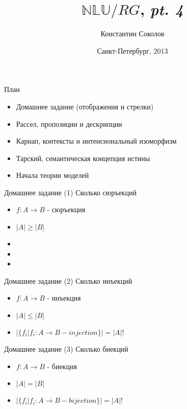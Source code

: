 \documentclass{beamer}
\begin{document}
\title{\huge{$\mathbb{NLU}/RG$, \textit{pt. 4}}}
\author{Константин Соколов}
\date{Санкт-Петербург, 2013} 
\begin{frame}
    \thispagestyle{empty}
    \titlepage
\end{frame}

\begin{frame}{План}
    \setcounter{framenumber}{1}
    \begin{itemize}
        \item Домашнее задание (отображения и стрелки)
        \item Рассел, пропозиции и дескрипции
        \item Карнап, контексты и интенсиональный изоморфизм
        \item Тарский, семантическая концепция истины
        \item Начала теории моделей
    \end{itemize}
\end{frame}

\begin{frame}{Домашнее задание (1)}
Сколько сюръекций\\
  \begin{itemize}
    \item $f : A \to B$ - сюръекция
    \item $\left\vert{A}\right\vert \geq \left\vert{B}\right\vert$
    \item 
    \item 
    \item 
  \end{itemize}  
\end{frame}

\begin{frame}{Домашнее задание (2)}
Сколько инъекций\\
  \begin{itemize}
    \item $f : A \to B$ - инъекция
    \item $\left\vert{A}\right\vert \leq \left\vert{B}\right\vert$
    \item $\left\vert{\{f_i | f_i : A \to B - injection\}}\right\vert = \left\vert{A}\right\vert!$
  \end{itemize}  
\end{frame}

\begin{frame}{Домашнее задание (3)}
Сколько биекций\\
  \begin{itemize}
    \item $f : A \to B$ - биекция
    \item $\left\vert{A}\right\vert = \left\vert{B}\right\vert$
    \item $\left\vert{\{f_i | f_i : A \to B - bijection\}}\right\vert = \left\vert{A}\right\vert!$
  \end{itemize}  
\end{frame}
\end{document}
